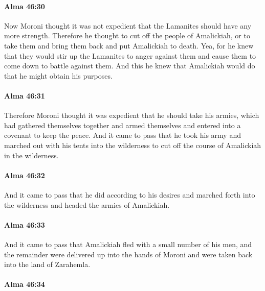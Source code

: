 		\paragraph{Alma 46:30} %
			\label{ALMA-46-30}

			Now Moroni thought it was not expedient
			that the Lamanites should have any more strength.
			Therefore he thought to cut off the people of Amalickiah,
			or to take them and bring them back
			and put Amalickiah to death.
			Yea, for he knew that they would stir up the Lamanites to anger against them
			and cause them to come down to battle against them.
			And this he knew that Amalickiah would do
			that he might obtain his purposes.

		\paragraph{Alma 46:31} %
			\label{ALMA-46-31}

			Therefore Moroni thought it was expedient
			that he should take his armies,
			which had gathered themselves together and armed themselves
			and entered into a covenant to keep the peace.
			And it came to pass that
			he took his army and marched out with his tents into the wilderness
			to cut off the course of Amalickiah in the wilderness.

		\paragraph{Alma 46:32} %
			\label{ALMA-46-32}

			And it came to pass that
			he did according to his desires and marched forth into the wilderness
			and headed the armies of Amalickiah.

		\paragraph{Alma 46:33} %
			\label{ALMA-46-33}

			And it came to pass that Amalickiah fled with a small number of his men,
			and the remainder were delivered up into the hands of Moroni
			and were taken back into the land of Zarahemla.

		\paragraph{Alma 46:34} %
			\label{ALMA-46-34}


